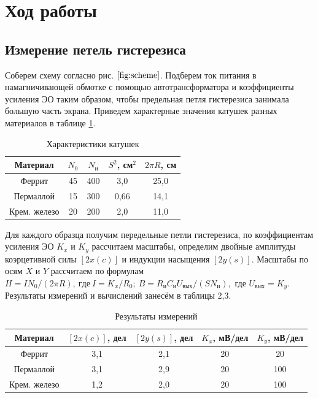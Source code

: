 \documentclass[12pt,a4paper]{article}
\begin{document}
 
\section{Ход работы}
\subsection{Измерение петель гистерезиса}

Соберем схему согласно рис. $\ref{fig:scheme}$. Подберем ток питания в намагничивающей обмотке с помощью автотрансформатора и коэффициенты усиления ЭО таким образом, чтобы предельная петля гистерезиса занимала большую часть экрана. Приведем характерные значения катушек разных материалов в таблице \ref{tab:har_kat}.

\begin{table}[h!]
	\centering
	\begin{tabular}{|c|c|c|c|c|}
		\hline
		Материал     & $N_0$ & $N_\text{и}$ & $S^2$, см$^2$ & $2\pi R$, см \\ \hline
		Феррит       & 45    & 400                              & 3,0           & 25,0         \\ \hline
		Пермаллой    & 15    & 300                              & 0,66           & 14,1         \\ \hline
		Крем. железо & 20    & 200                              & 2,0           & 11,0         \\ \hline
	\end{tabular}
	\caption{Характеристики катушек}
	\label{tab:har_kat}
\end{table}

Для каждого образца получим передельные петли гистерезиса, по коэффициентам усиления ЭО $K_x$ и $K_y$ рассчитаем масштабы, определим двойные амплитуды коэрцетивной силы $ [2x(c)] $ и индукции насыщения $ [2y(s)] $. Масштабы по осям $ X $ и $ Y $ рассчитаем по формулам 
$H=IN_0/(2\pi R),\ где\ I=K_x/R_0;\ B=R_\text{и}C_\text{и}U_{\text{вых}}/(SN_\text{и}),$ где $U_{\text{вых}}=K_y$. Результаты измерений и вычислений занесём в таблицы 2,3.

\begin{table}[h!]
	\centering
	\begin{tabular}{|c|c|c|c|c|}
		\hline
		Материал     & $[2x(c)]$, дел & $[2y(s)]$, дел & $K_x$, мВ/дел & $K_y$, мВ/дел \\ \hline
		Феррит       & 3,1            & 2,1            & 20            & 20            \\ \hline
		Пермаллой    & 3,1            & 2,9            & 20            & 100            \\ \hline
		Крем. железо & 1,2            & 2,0            & 20           & 100            \\ \hline
	\end{tabular}
 	\caption{Результаты измерений}

\end{table}
\end{document}
